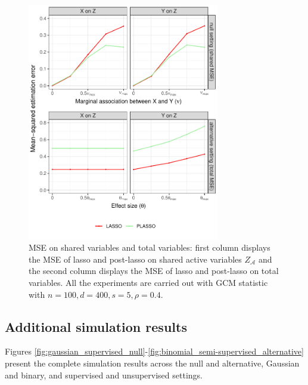 \documentclass[aos]{imsart}
\theoremstyle{plain}
\theoremstyle{remark}
\newcommand{\new}[1]{{\color{darkgreen}{#1}}}
\begin{document}
\begin{figure}[!ht]
	\centering
	\includegraphics[width = 0.75\textwidth]{figures/MSE.pdf}
	\caption{MSE on shared variables and total variables: first column displays the MSE of lasso and post-lasso on shared active variables $Z_{\mathcal{A}}$ and the second column displays the MSE of lasso and post-lasso on total variables. All the experiments are carried out with GCM statistic with $n=100,d=400,s=5,\rho=0.4$. \new{All the standard errors are less than 0.014.}}
	\label{fig:MSE}
\end{figure}

\subsection{Additional simulation results} \label{sec:additional-simulation-results}

Figures \ref{fig:gaussian_supervised_null}-\ref{fig:binomial_semi-supervised_alternative} present the complete simulation results across the null and alternative, Gaussian and binary, and supervised and unsupervised settings. \new{All the standard errors are less than 0.026.}
\end{document}
